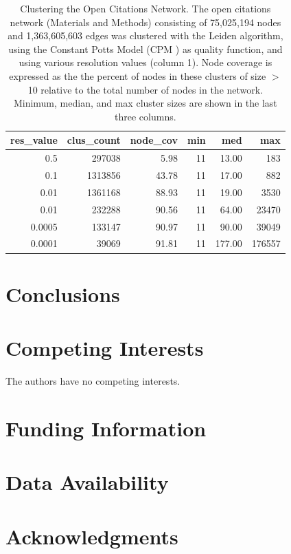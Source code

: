 \documentclass[12pt, oneside]{article}   	%
\begin{document}
\begin{table}[ht]
\centering
\begin{tabular}{rrrrrr}
  \hline
 res\_value & clus\_count & node\_cov & min & med & max \\ 
  \hline
0.5 & 297038 & 5.98 &  11 & 13.00 & 183 \\ 
0.1 & 1313856 & 43.78 &  11 & 17.00 & 882 \\ 
0.01 & 1361168 & 88.93 &  11 & 19.00 & 3530 \\ 
0.01 & 232288 & 90.56 &  11 & 64.00 & 23470 \\ 
0.0005 & 133147 & 90.97 &  11 & 90.00 & 39049 \\  
0.0001 & 39069 & 91.81 &  11 & 177.00 & 176557 \\ 
   \hline
\end{tabular}
\caption{Clustering the Open Citations Network. The open citations network (Materials and Methods) consisting of 75,025,194 nodes and 1,363,605,603 edges was clustered with the Leiden algorithm, using the Constant Potts Model (CPM ) as quality function, and using various resolution values (column 1). Node coverage is expressed as the the percent of nodes in these clusters of size $>$ 10 relative to the total number of nodes in the network. Minimum, median, and max cluster sizes are shown in the last three columns.  }
\end{table}


		
\section{Conclusions}
	
\section*{Competing Interests} \vspace{3mm} The authors have no competing interests. 
	
\section*{Funding Information} 
	
\section*{Data Availability} 
	
\section*{Acknowledgments} 



\end{document}
